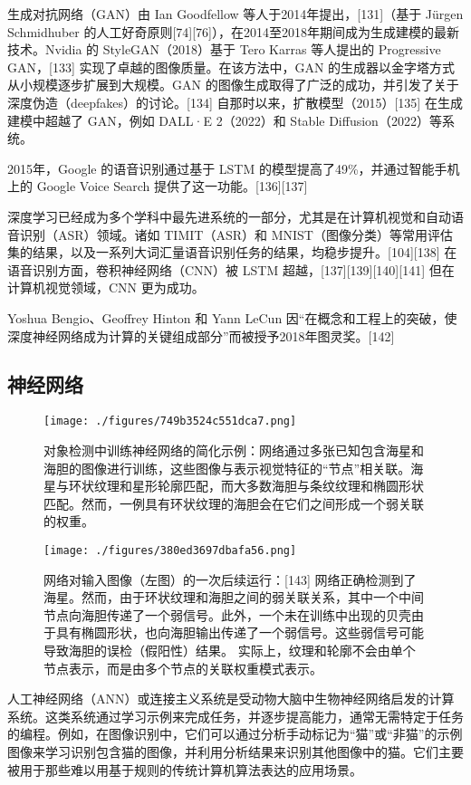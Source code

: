 生成对抗网络（GAN）由 Ian Goodfellow 等人于2014年提出，[131]（基于 Jürgen Schmidhuber 的人工好奇原则[74][76]），在2014至2018年期间成为生成建模的最新技术。Nvidia 的 StyleGAN（2018）基于 Tero Karras 等人提出的 Progressive GAN，[133] 实现了卓越的图像质量。在该方法中，GAN 的生成器以金字塔方式从小规模逐步扩展到大规模。GAN 的图像生成取得了广泛的成功，并引发了关于深度伪造（deepfakes）的讨论。[134] 自那时以来，扩散模型（2015）[135] 在生成建模中超越了 GAN，例如 DALL·E 2（2022）和 Stable Diffusion（2022）等系统。

2015年，Google 的语音识别通过基于 LSTM 的模型提高了49\%，并通过智能手机上的 Google Voice Search 提供了这一功能。[136][137]

深度学习已经成为多个学科中最先进系统的一部分，尤其是在计算机视觉和自动语音识别（ASR）领域。诸如 TIMIT（ASR）和 MNIST（图像分类）等常用评估集的结果，以及一系列大词汇量语音识别任务的结果，均稳步提升。[104][138] 在语音识别方面，卷积神经网络（CNN）被 LSTM 超越，[137][139][140][141] 但在计算机视觉领域，CNN 更为成功。

Yoshua Bengio、Geoffrey Hinton 和 Yann LeCun 因“在概念和工程上的突破，使深度神经网络成为计算的关键组成部分”而被授予2018年图灵奖。[142]
\subsection{神经网络}
\begin{figure}[ht]
\centering
\texttt{[image: ./figures/749b3524c551dca7.png]}
\caption{对象检测中训练神经网络的简化示例：网络通过多张已知包含海星和海胆的图像进行训练，这些图像与表示视觉特征的“节点”相关联。海星与环状纹理和星形轮廓匹配，而大多数海胆与条纹纹理和椭圆形状匹配。然而，一例具有环状纹理的海胆会在它们之间形成一个弱关联的权重。} \label{fig_SDXX_3}
\end{figure}
\begin{figure}[ht]
\centering
\texttt{[image: ./figures/380ed3697dbafa56.png]}
\caption{网络对输入图像（左图）的一次后续运行：[143] 网络正确检测到了海星。然而，由于环状纹理和海胆之间的弱关联关系，其中一个中间节点向海胆传递了一个弱信号。此外，一个未在训练中出现的贝壳由于具有椭圆形状，也向海胆输出传递了一个弱信号。这些弱信号可能导致海胆的误检（假阳性）结果。  实际上，纹理和轮廓不会由单个节点表示，而是由多个节点的关联权重模式表示。} \label{fig_SDXX_4}
\end{figure}
人工神经网络（ANN）或连接主义系统是受动物大脑中生物神经网络启发的计算系统。这类系统通过学习示例来完成任务，并逐步提高能力，通常无需特定于任务的编程。例如，在图像识别中，它们可以通过分析手动标记为“猫”或“非猫”的示例图像来学习识别包含猫的图像，并利用分析结果来识别其他图像中的猫。它们主要被用于那些难以用基于规则的传统计算机算法表达的应用场景。

